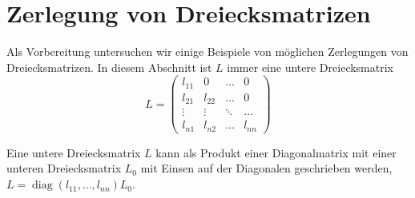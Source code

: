 %
%
%
\section{Zerlegung von Dreiecksmatrizen}
Als Vorbereitung untersuchen wir einige Beispiele von möglichen
Zerlegungen von Dreiecksmatrizen.
In diesem Abschnitt ist $L$ immer eine untere Dreiecksmatrix
\[
L=\begin{pmatrix}
l_{11}&0     &\dots &0     \\
l_{21}&l_{22}&\dots &0     \\
\vdots&\vdots&\ddots&\dots \\
l_{n1}&l_{n2}&\dots &l_{nn}
\end{pmatrix}
\]
\begin{hilfssatz}
Eine untere Dreiecksmatrix $L$ kann als Produkt einer Diagonalmatrix
mit einer unteren Dreiecksmatrix $L_0$ mit Einsen auf der Diagonalen
geschrieben werden, $L=\operatorname{diag}(l_{11},\dots,l_{nn}) L_0$.
\end{hilfssatz}


